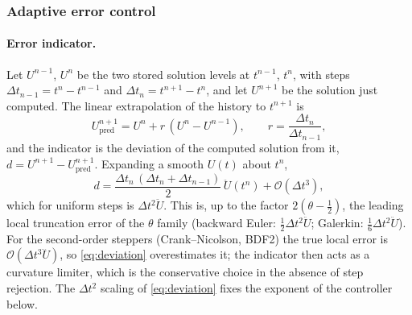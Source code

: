 \documentclass[11pt,a4paper]{article}
\begin{document}
\subsubsection*{Adaptive error control}
\label{sec:adaptive}

\paragraph{Error indicator.}
Let $U^{n-1}$, $U^{n}$ be the two stored solution levels at $t^{n-1}$, $t^{n}$,
with steps $\Delta t_{n-1} = t^{n} - t^{n-1}$ and $\Delta t_{n} = t^{n+1} - t^{n}$,
and let $U^{n+1}$ be the solution just computed. The linear extrapolation of the
history to $t^{n+1}$ is
\begin{equation}
  U^{n+1}_{\mathrm{pred}} = U^{n} + r\,(U^{n} - U^{n-1}),
  \qquad r = \frac{\Delta t_{n}}{\Delta t_{n-1}},
  \label{eq:predictor}
\end{equation}
and the indicator is the deviation of the computed solution from it,
$d = U^{n+1} - U^{n+1}_{\mathrm{pred}}$. Expanding a smooth $U(t)$ about $t^{n}$,
\begin{equation}
  d = \frac{\Delta t_{n}\,(\Delta t_{n} + \Delta t_{n-1})}{2}\,\ddot U(t^{n})
      + \mathcal O(\Delta t^{3}),
  \label{eq:deviation}
\end{equation}
which for uniform steps is $\Delta t^{2}\ddot U$. This is, up to the factor
$2(\theta - \tfrac12)$, the leading local truncation error of the
$\theta$ family (backward Euler: $\tfrac12\Delta t^{2}\ddot U$; Galerkin:
$\tfrac16\Delta t^{2}\ddot U$). For the second-order steppers (Crank--Nicolson,
BDF2) the true local error is $\mathcal O(\Delta t^{3}\dddot U)$, so
\eqref{eq:deviation} overestimates it; the indicator then acts as a curvature
limiter, which is the conservative choice in the absence of step rejection.
The $\Delta t^{2}$ scaling of \eqref{eq:deviation} fixes the exponent of the
controller below.
\end{document}
